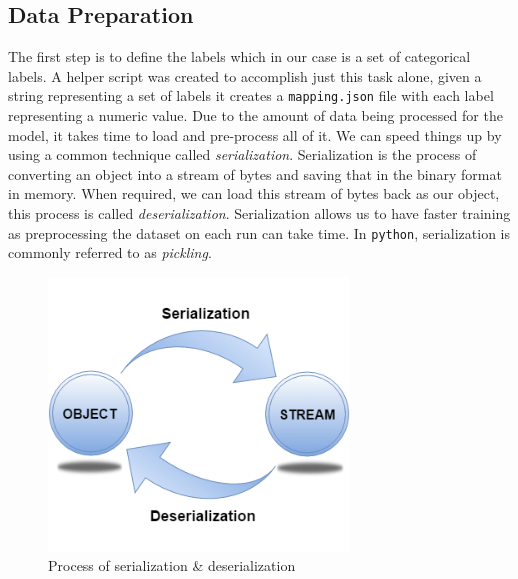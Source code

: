 \documentclass[twocolumn]{article}
\begin{document}
\subsection{Data Preparation}

The first step is to define the labels which in our case is a set of
categorical labels. A helper script was created to accomplish just this task 
alone, given a string representing a set of labels it creates a 
\texttt{mapping.json} file with each label representing a numeric value. Due 
to the amount of data being processed for the model, it takes time to load and 
pre-process all of it. We can speed things up by using a common technique 
called \textit{serialization}. Serialization is the process of converting an 
object into a stream of bytes and saving that in the binary format in memory. 
When required, we can load this stream of bytes back as our object, this 
process is called \textit{deserialization}. Serialization allows us to have 
faster training as preprocessing the dataset on each run can take time. In 
\texttt{python}, serialization is commonly referred to as \textit{pickling}.

\begin{figure}[h]
\centering
\includegraphics[width=8cm]{./figures/serialization and deserialization}
\caption{Process of serialization \& deserialization}
\end{figure}
\end{document}
